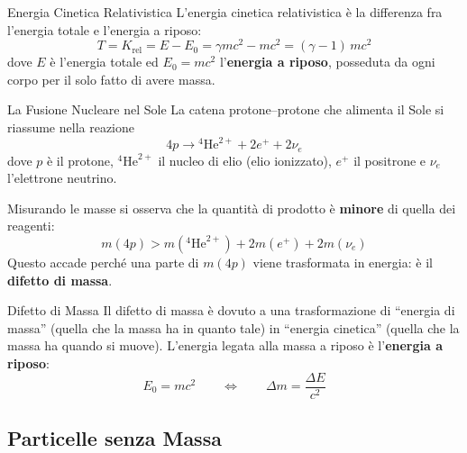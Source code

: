 \begin{definizione}{Energia Cinetica Relativistica}
L'energia cinetica relativistica è la differenza fra l'energia totale e l'energia a riposo:
\begin{equation}
    T = K_{\text{rel}} = E - E_0 = \gamma m c^2 - mc^2 = (\gamma - 1)\,mc^2
\end{equation}
dove $E$ è l'energia totale ed $E_0 = mc^2$ l'\textbf{energia a riposo}, posseduta da ogni corpo per il solo fatto di avere massa.
\end{definizione}

\begin{esempio}{La Fusione Nucleare nel Sole}
La catena protone--protone che alimenta il Sole si riassume nella reazione
\begin{equation}
    4p \longrightarrow {}^{4}\mathrm{He}^{2+} + 2e^{+} + 2\nu_e
\end{equation}
dove $p$ è il protone, ${}^{4}\mathrm{He}^{2+}$ il nucleo di elio (elio ionizzato), $e^+$ il positrone e $\nu_e$ l'elettrone neutrino.

Misurando le masse si osserva che la quantità di prodotto è \textbf{minore} di quella dei reagenti:
\begin{equation*}
    m(4p) > m({}^{4}\mathrm{He}^{2+}) + 2m(e^+) + 2m(\nu_e)
\end{equation*}
Questo accade perché una parte di $m(4p)$ viene trasformata in energia: è il \textbf{difetto di massa}.
\end{esempio}

\begin{definizione}{Difetto di Massa}
Il difetto di massa è dovuto a una trasformazione di ``energia di massa'' (quella che la massa ha in quanto tale) in ``energia cinetica'' (quella che la massa ha quando si muove). L'energia legata alla massa a riposo è l'\textbf{energia a riposo}:
\begin{equation}
    E_0 = mc^2
    \qquad \Longleftrightarrow \qquad
    \Delta m = \frac{\Delta E}{c^2}
\end{equation}
\end{definizione}

\subsection{Particelle senza Massa}

